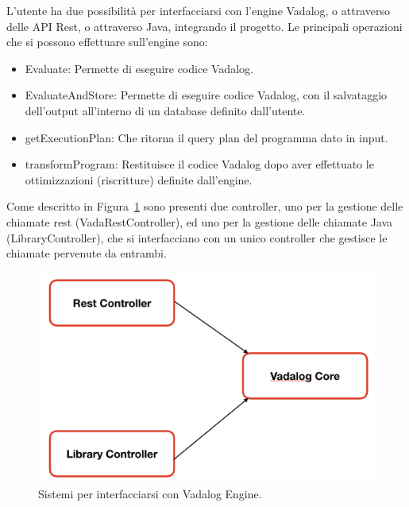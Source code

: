 L'utente ha due possibilità per interfacciarsi con l'engine Vadalog, o attraverso delle API Rest, o attraverso Java, integrando il progetto. \newline
Le principali operazioni che si possono effettuare sull'engine sono: 
\begin{itemize}
	\item Evaluate: Permette di eseguire codice Vadalog.
	\item EvaluateAndStore: Permette di eseguire codice Vadalog, con il salvataggio dell'output all'interno di un database definito dall'utente.
	\item getExecutionPlan: Che ritorna il query plan del programma dato in input.
	\item transformProgram: Restituisce il codice Vadalog dopo aver effettuato le ottimizzazioni (riscritture) definite dall'engine.
\end{itemize}
Come descritto in Figura~\ref{fig:architettura_2} sono presenti due controller, uno per la gestione delle chiamate rest (VadaRestController), ed uno per la gestione delle chiamate Java (LibraryController), che si interfacciano con un unico controller che gestisce le chiamate pervenute da entrambi. \newline

\begin{figure}[h!]
	\centering
	\includegraphics[width=0.8\linewidth]{figure/architettura-2}
	\caption{Sistemi per interfacciarsi con Vadalog Engine.}
	\label{fig:architettura_2}
\end{figure}

